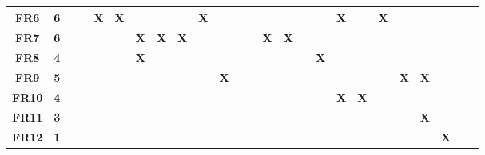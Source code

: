 \documentclass[11pt]{article}
\begin{document}
\begin{landscape}
\begin{table}[ht!]
{\begin{tabular}{|c|c|c|c|c|c|c|c|c|c|c|c|c|c|c|c|c|c|c|c|c|c|c|c|c|}
						\textbf{FR6}          & \textbf{6}         & \textbf{}  & \textbf{}  & \textbf{X} & \textbf{X} & \textbf{}  & \textbf{}  & \textbf{}  & \textbf{X} & \textbf{}  & \textbf{}  & \textbf{}  & \textbf{}  & \textbf{}  & \textbf{}  & \textbf{}  & \textbf{X} & \textbf{}  & \textbf{X} & \textbf{}  & \textbf{}  & \textbf{}  & \textbf{}  & \textbf{}  \\ \hline
						\textbf{FR7}          & \textbf{6}         & \textbf{}  & \textbf{}  & \textbf{}  & \textbf{}  & \textbf{X} & \textbf{X} & \textbf{X} & \textbf{}  & \textbf{}  & \textbf{}  & \textbf{}  & \textbf{X} & \textbf{X} & \textbf{}  & \textbf{}  & \textbf{}  & \textbf{}  & \textbf{}  & \textbf{}  & \textbf{}  & \textbf{}  & \textbf{}  & \textbf{}  \\ \hline
						\textbf{FR8}          & \textbf{4}         & \textbf{}  & \textbf{}  & \textbf{}  & \textbf{}  & \textbf{X} & \textbf{}  & \textbf{}  & \textbf{}  & \textbf{}  & \textbf{}  & \textbf{}  & \textbf{}  & \textbf{}  & \textbf{}  & \textbf{X} & \textbf{}  & \textbf{}  & \textbf{}  & \textbf{}  & \textbf{}  & \textbf{}  & \textbf{}  & \textbf{}  \\ \hline
						\textbf{FR9}          & \textbf{5}         & \textbf{}  & \textbf{}  & \textbf{}  & \textbf{}  & \textbf{}  & \textbf{}  & \textbf{}  & \textbf{}  & \textbf{X} & \textbf{}  & \textbf{}  & \textbf{}  & \textbf{}  & \textbf{}  & \textbf{}  & \textbf{}  & \textbf{}  & \textbf{}  & \textbf{X} & \textbf{X} & \textbf{}  & \textbf{}  & \textbf{}  \\ \hline
						\textbf{FR10}         & \textbf{4}         & \textbf{}  & \textbf{}  & \textbf{}  & \textbf{}  & \textbf{}  & \textbf{}  & \textbf{}  & \textbf{}  & \textbf{}  & \textbf{}  & \textbf{}  & \textbf{}  & \textbf{}  & \textbf{}  & \textbf{}  & \textbf{X} & \textbf{X} & \textbf{}  & \textbf{}  & \textbf{}  & \textbf{}  & \textbf{}  & \textbf{}  \\ \hline
						\textbf{FR11}         & \textbf{3}         & \textbf{}  & \textbf{}  & \textbf{}  & \textbf{}  & \textbf{}  & \textbf{}  & \textbf{}  & \textbf{}  & \textbf{}  & \textbf{}  & \textbf{}  & \textbf{}  & \textbf{}  & \textbf{}  & \textbf{}  & \textbf{}  & \textbf{}  & \textbf{}  & \textbf{}  & \textbf{X} & \textbf{}  & \textbf{}  & \textbf{}  \\ \hline
						\textbf{FR12}         & \textbf{1}         & \textbf{}  & \textbf{}  & \textbf{}  & \textbf{}  & \textbf{}  & \textbf{}  & \textbf{}  & \textbf{}  & \textbf{}  & \textbf{}  & \textbf{}  & \textbf{}  & \textbf{}  & \textbf{}  & \textbf{}  & \textbf{}  & \textbf{}  & \textbf{}  & \textbf{}  & \textbf{}  & \textbf{X} & \textbf{}  & \textbf{}  \\ \hline

\end{tabular}}
\end{table}
\end{landscape}
\end{document}
